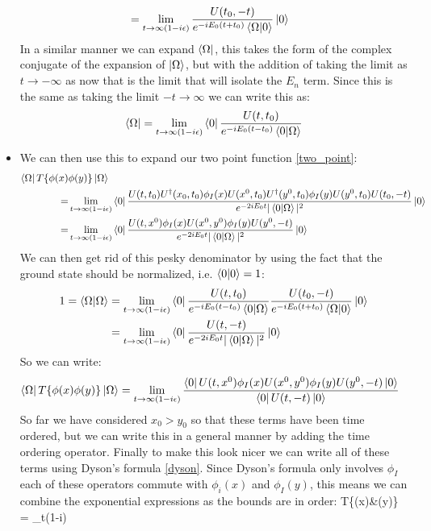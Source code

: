 \documentclass[11pt]{article}
\renewenvironment{flalign}{\vspace{-2mm}\empheq[box=\tcbhighmath]{align}}{\endempheq}
\numberwithin{equation}{section}
\begin{document}
\begin{itemize}
\begin{align*}
    & = \lim_{t\rightarrow\infty(1-i\epsilon)}\frac{U(t_0,-t)}{e^{-iE_0(t+t_0)}\braket{\Omega|0}}\ket{0}
  \end{align*}
  In a similar manner we can expand $\bra{\Omega}$, this takes the form of the complex conjugate of the expansion of $\ket{\Omega}$, but with the addition of taking the limit as $t \rightarrow -\infty$ as now that is the limit that will isolate the $E_n$ term. Since this is the same as taking the limit $-t\rightarrow \infty$ we can write this as:
  \begin{align*}
    \bra{\Omega}=\lim_{t\rightarrow\infty(1-i\epsilon)}\bra{0}\frac{U(t,t_0)}{e^{-iE_0(t-t_0)}\braket{0|\Omega}}
  \end{align*}
  \item We can then use this to expand our two point function \ref{two_point}:
  \begin{align}
  \label{e^-iEt}
     \bra{\Omega}T\{\phi(x)&\phi(y)\}\ket{\Omega} \nonumber\\
      = & \lim_{t\rightarrow\infty(1-i\epsilon)}\bra{0}\frac{U(t,t_0)U^{\dagger}(x_0,t_0)\phi_I(x)U(x^0,t_0)U^{\dagger}(y^0,t_0)\phi_I(y)U(y^0,t_0)U(t_0,-t)}{e^{-2iE_0t}|\braket{0|\Omega}|^2}\ket{0} \nonumber \\
      = & \lim_{t\rightarrow\infty(1-i\epsilon)}\bra{0}\frac{U(t,x^0)\phi_I(x)U(x^0,y^0)\phi_I(y)U(y^0,-t)}{e^{-2iE_0t}|\braket{0|\Omega}|^2}\ket{0}
  \end{align}
  We can then get rid of this pesky denominator by using the fact that the ground state should be normalized, i.e. $\braket{0|0}=1$:
  \begin{align*}
    1= \braket{\Omega|\Omega} &= \lim_{t\rightarrow\infty(1-i\epsilon)}\bra{0}\frac{U(t,t_0)}{e^{-iE_0(t-t_0)}\braket{0|\Omega}}\frac{U(t_0,-t)}{e^{-iE_0(t+t_0)}\braket{\Omega|0}}\ket{0} \\
    & = \lim_{t\rightarrow\infty(1-i\epsilon)}\bra{0}\frac{U(t,-t)}{e^{-2iE_0t}|\braket{0|\Omega}|^2}\ket{0}
  \end{align*}
  So we can write:
  \begin{align*}
    \bra{\Omega}T\{\phi(x)&\phi(y)\}\ket{\Omega} = \lim_{t\rightarrow\infty(1-i\epsilon)}\frac{\bra{0}U(t,x^0)\phi_I(x)U(x^0,y^0)\phi_I(y)U(y^0,-t)\ket{0}}{\bra{0}U(t,-t)\ket{0}}
  \end{align*}
  So far we have considered $x_0>y_0$ so that these terms have been time ordered, but we can write this in a general manner by adding the time ordering operator. Finally to make this look nicer we can write all of these terms using Dyson's formula \ref{dyson}. Since Dyson's formula only involves $\phi_I$ each of these operators commute with $\phi_i(x)$ and $\phi_I(y)$, this means we can combine the exponential expressions as the bounds are in order:  
    \begin{flalign}
    \label{2_point_inter}
    \bra{\Omega}T\{\phi(x)&\phi(y)\}\ket{\Omega} = \lim_{t\rightarrow\infty(1-i\epsilon)}
  \end{flalign}
\end{itemize}
\end{document}
